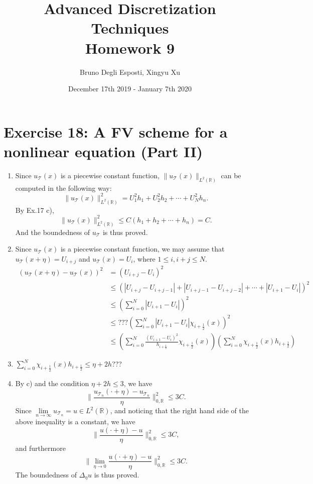 \documentclass[a4paper]{article}
\title{\huge{Advanced Discretization Techniques \\ Homework 9}}
\author{\Large{Bruno Degli Esposti, Xingyu Xu}}
\date{December 17th 2019 - January 7th 2020}
\begin{document}
\maketitle

\section*{Exercise 18: A FV scheme for a nonlinear equation (Part II)}
\begin{enumerate}[label=\textbf{\alph*)},leftmargin=*]

 \item Since $u_\mathcal{T}(x)$ is a piecewise constant function, $\|u_\mathcal{T}(x)\|_{L^2(\mathbb{R})}$ can be computed in the following way:
 $$
 \|u_\mathcal{T}(x)\|^2_{L^2(\mathbb{R})}=U_1^2h_1+U_2^2h_2+\cdots+U_N^2h_n.
 $$
 By Ex.17 c),
 $$
 \|u_\mathcal{T}(x)\|^2_{L^2(\mathbb{R})}\leq C(h_1+h_2+\cdots+h_n)=C.
 $$
 And the boundedness of $u_\mathcal{T}$ is thus proved.
 \item Since $u_\mathcal{T}(x)$ is a piecewise constant function, we may assume that $u_\mathcal{T}(x+\eta)=U_{i+j}$ and $u_\mathcal{T}(x)=U_i$, where $1\leq i,i+j\leq N$.
 \begin{align*}
(u_\mathcal{T}(x+\eta)-u_\mathcal{T}(x))^2&=(U_{i+j}-U_i)^2\\
                                          &\leq(|U_{i+j}-U_{i+j-1}|+|U_{i+j-1}-U_{i+j-2}|+\cdots+|U_{i+1}-U_i|)^2\\
                                          &\leq\left(\sum^N_{i=0}|U_{i+1}-U_i|\right)^2\\
                                          &\leq???\left(\sum^N_{i=0}|U_{i+1}-U_i|\chi_{i+\frac{1}{2}}(x)\right)^2\\
                                          &\leq\left(\sum^N_{i=0}\frac{(U_{i+1}-U_i)^2}{h_{i+\frac{1}{2}}}\chi_{i+\frac{1}{2}}(x)\right)\left(\sum^N_{i=0}\chi_{i+\frac{1}{2}}(x)h_{i+\frac{1}{2}}\right)
 \end{align*}

 \item $\sum\limits_{i=0}^N\chi_{i+\frac{1}{2}}(x)h_{i+\frac{1}{2}}\leq\eta+2h$???



 \item By c) and the condition $\eta+2h\leq3$, we have
 $$
 \|\frac{u_{\mathcal{T}_n}(\cdot+\eta)-u_{\mathcal{T}_n}}{\eta}\|^2_{0,\mathbb{R}}\leq3C.
 $$
 Since $\lim\limits_{n\to\infty}u_{\mathcal{T}_n}=u\in L^2(\mathbb{R})$, and noticing that the right hand side of the above inequality is a constant, we have
 $$
 \|\frac{u(\cdot+\eta)-u}{\eta}\|^2_{0,\mathbb{R}}\leq3C,
 $$
 and furthermore
 $$
 \|\lim_{\eta\to 0}\frac{u(\cdot+\eta)-u}{\eta}\|^2_{0,\mathbb{R}}\leq3C.
 $$
 The boundedness of $\Delta_\eta u$ is thus proved.


\end{enumerate}
\end{document}
